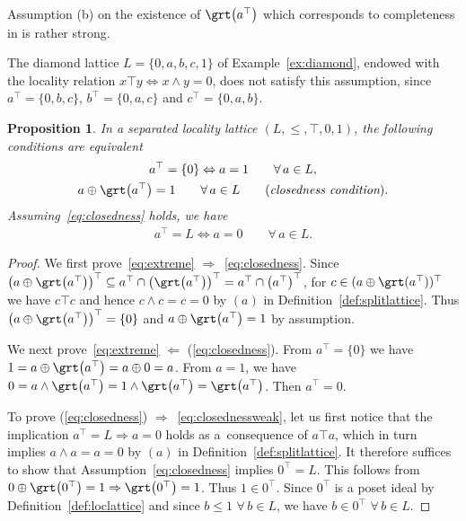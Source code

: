 \documentclass[10pt,a4paper]{amsart}
\numberwithin{equation}{section}
\newtheorem{Proposition}[Theorem]{Proposition}
\newcommand{\loc}{locality\xspace}
\begin{document}
Assumption (b) on the existence of $\grt\big(a^\top\big)$ which corresponds to completeness in \cite[Definition 2.4]{CM} is rather strong.
	\begin{coex}The diamond lattice	$L=\{0,a,b,c,1\}$ of Example~\ref{ex:diamond}, endowed with the \loc relation $x\top y\Leftrightarrow x\wedge y=0$, does not satisfy this assumption, since $a^\top=\{0,b,c\}$, $b^\top=\{0,a,c\}$ and $c^\top=\{0,a,b\}$.
\end{coex}

\begin{Proposition}	\label{lem:full}
	In a separated locality lattice $(L, \leq,\top, 0,1 )$, the following conditions are equi\-valent
\begin{gather} 	
a^\top=\{0\}\Leftrightarrow a=1 \qquad \forall\, a\in L, \label{eq:extreme}
\\
a\oplus \grt\big(a^\top\big)=1\qquad \forall\, a\in L\qquad (\text{\it closedness condition}).
\label{eq:closedness}
\end{gather}
Assuming~\eqref{eq:closedness} holds, we have
\begin{gather} 	
\label{eq:closednessweak}
a^\top=L\Leftrightarrow a=0\qquad \forall\, a\in L.
\end{gather}
\end{Proposition}

\begin{proof}
We first prove~\eqref{eq:extreme} $\Longrightarrow$~\eqref{eq:closedness}.
Since $\big(a\oplus \grt \big(a^\top\big)\big)^\top \subseteq a^\top \cap \big(\grt \big(a^\top\big)\big)^\top = a^\top \cap \big(a^\top\big)^\top$, for $c\in (a\oplus \grt (a^\top))^\top$ we have $c\top c$ and hence $c\wedge c=c=0$ by $(a)$ in Definition~\ref{def:splitlattice}. Thus $\big(a\oplus \grt \big(a^\top\big)\big)^\top=\{0\}$ and $a\oplus \grt \big(a^\top\big)=1$ by assumption.

We next prove~\eqref{eq:extreme} $\Longleftarrow$ (\ref{eq:closedness}).
From $a^\top = \{0\}$ we have
$1=a\oplus \grt\big(a^\top\big)=a\oplus 0=a$. From $a=1$, we have
$0=a\wedge \grt \big(a^\top\big) =1\wedge \grt\big(a^\top\big)=\grt\big(a^\top\big)$. Then $a^\top=0$.

To prove (\ref{eq:closedness}) $\Longrightarrow$~\eqref{eq:closednessweak}, let us first notice that the implication $a^\top=L\Rightarrow a=0$ holds as a~consequence of $a\top a$, which in turn implies $a\wedge a=a=0$ by $(a)$ in Definition~\ref{def:splitlattice}. It therefore suffices to show that Assumption~\eqref{eq:closedness} implies $0^\top=L$. This follows from $0\oplus\grt\big(0^\top\big)=1\Rightarrow\grt\big(0^\top\big)=1$. Thus $1\in 0^\top$. Since $0^\top$ is a poset ideal by Definition~\ref{def:loclattice} and since $b\leq 1$ $\forall\, b\in L$, we have $b\in 0^\top $ $\forall\, b\in L$.
\end{proof}
\end{document}
